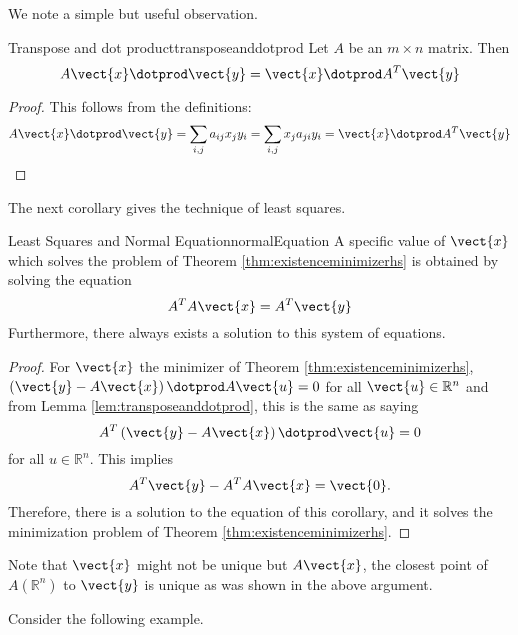 We note a simple but useful observation.

\begin{lemma}{Transpose and dot product}{transposeanddotprod}
Let $A$ be an $m\times n$ matrix. Then 
\begin{equation*}
A\vect{x} \dotprod \vect{y} = \vect{x}\dotprod A^T\vect{y} 
\end{equation*}
\end{lemma}

\begin{proof}
This follows from the definitions:
\[ A\vect{x} \dotprod \vect{y}=\sum_{i,j}a_{ij}x_{j} y_{i}
=\sum_{i,j}x_{j} a_{ji} y_{i}= \vect{x} \dotprod A^T\vect{y}
\] \end{proof}

The next corollary gives the technique of least squares.

\begin{corollary}{Least Squares and Normal Equation}{normalEquation}
A specific value of $\vect{x}$ which solves the problem of Theorem 
\ref{thm:existenceminimizerhs} is obtained by solving the equation
\begin{equation*}
A^TA\vect{x}=A^T\vect{y}
\end{equation*}
Furthermore, there always exists a solution to this system of equations.
\end{corollary}

\begin{proof} 
For $\vect{x}$ the minimizer of Theorem \ref{thm:existenceminimizerhs}, $\left(
\vect{y}-A\vect{x}\right) \dotprod A \vect{u} =0$ for all $\vect{u} \in \mathbb{R}^{n}$ and from
Lemma \ref{lem:transposeanddotprod}, this is the same as saying
\begin{equation*}
A^T\left( \vect{y}-A\vect{x}\right) \dotprod \vect{u}=0
\end{equation*}
for all $u \in \mathbb{R}^{n}.$ This implies 
\begin{equation*}
A^T\vect{y}-A^TA\vect{x}=\vect{0}.
\end{equation*}
Therefore, there is a solution to the equation of this corollary, and it
solves the minimization problem of Theorem \ref{thm:existenceminimizerhs}.
\end{proof}

Note that $\vect{x}$ might not be unique but $A\vect{x}$, the closest
point of $A\left(\mathbb{R}^{n}\right)$ to $\vect{y}$ is unique as was shown in the
above argument. 

Consider the following example. 

